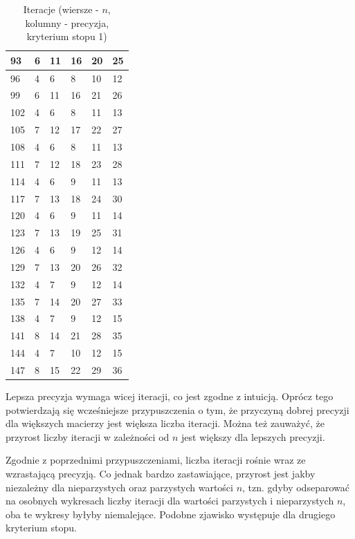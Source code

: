 \documentclass{article}
\begin{document}
\begin{table}[H]
\begin{tabular}{|l|l|l|l|l|l|}
93 & 6 & 11 & 16 & 20 & 25 \\ \hline
96 & 4 & 6 & 8 & 10 & 12 \\ \hline
99 & 6 & 11 & 16 & 21 & 26 \\ \hline
102 & 4 & 6 & 8 & 11 & 13 \\ \hline
105 & 7 & 12 & 17 & 22 & 27 \\ \hline
108 & 4 & 6 & 8 & 11 & 13 \\ \hline
111 & 7 & 12 & 18 & 23 & 28 \\ \hline
114 & 4 & 6 & 9 & 11 & 13 \\ \hline
117 & 7 & 13 & 18 & 24 & 30 \\ \hline
120 & 4 & 6 & 9 & 11 & 14 \\ \hline
123 & 7 & 13 & 19 & 25 & 31 \\ \hline
126 & 4 & 6 & 9 & 12 & 14 \\ \hline
129 & 7 & 13 & 20 & 26 & 32 \\ \hline
132 & 4 & 7 & 9 & 12 & 14 \\ \hline
135 & 7 & 14 & 20 & 27 & 33 \\ \hline
138 & 4 & 7 & 9 & 12 & 15 \\ \hline
141 & 8 & 14 & 21 & 28 & 35 \\ \hline
144 & 4 & 7 & 10 & 12 & 15 \\ \hline
147 & 8 & 15 & 22 & 29 & 36 \\ \hline
\end{tabular}
\caption{Iteracje (wiersze - $n$, kolumny - precyzja, kryterium stopu 1)}
\end{table}

Lepsza precyzja wymaga wicej iteracji, co jest zgodne z intuicją. Oprócz tego potwierdzają się wcześniejsze przypuszczenia
o tym, że przyczyną dobrej precyzji dla większych macierzy jest większa liczba iteracji. Można też zauważyć, że przyrost
liczby iteracji w zależności od $n$ jest większy dla lepszych precyzji.

Zgodnie z poprzednimi przypuszczeniami, liczba iteracji rośnie wraz ze wzrastającą precyzją. Co jednak bardzo zastawiające, 
przyrost jest jakby niezależny dla nieparzystych oraz parzystych wartości $n$, tzn. gdyby odseparować na osobnych wykresach
liczby iteracji dla wartości parzystych i nieparzystych $n$, oba te wykresy byłyby niemalejące. Podobne zjawisko występuje
dla drugiego kryterium stopu.
\end{document}
